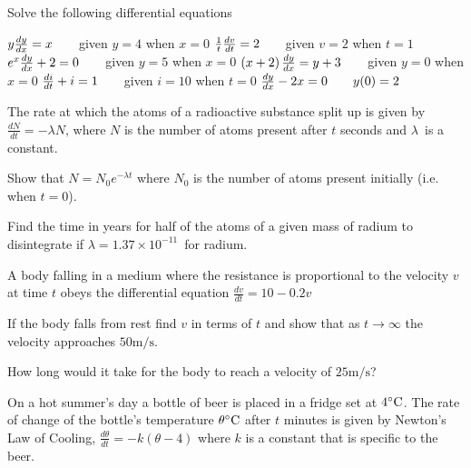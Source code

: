 \begin{Exercise}[title={Separable Equations},label=exSepEqns]
	\Question Solve the following differential equations  
	\begin{tasks}
		\task  $y \frac{d y}{d x} =x\text{\quad \quad }$given $y =4$ when $x =0$ %
		\task $\frac{1}{t} \frac{d v}{d t} =2\text{\quad \quad }$given $v =2$ when $t =1$ %
		\task $e^{x} \frac{d y}{d x} +2 =0\text{\quad \quad }$given $y =5$ when $x =0$ %
		\task $\left (x +2\right ) \frac{d y}{d x} =y +3\text{\quad \quad }$given $y =0$ when $x =0$ %
		\task $\frac{d i}{d t} +i =1\text{\quad \quad }$given $i =10$ when $t =0$ %
		\task $\frac{d y}{d x} -2 x =0\text{\quad \quad }y (0) =2$ %
	\end{tasks}
	

\Question The rate at which the atoms of a radioactive substance split up is given by $\frac{d N}{d t} = -\lambda  N\text{,}$ where $N$ is the number of atoms present after $t$ seconds and $\lambda $\ is a constant. 
\begin{tasks}
	\task Show that $N =N_{0} e^{ -\lambda  t}$ where $N_{0}$ is the number of atoms present initially (i.e. when $t =0$). 
	
	\task Find the time in years for half of the atoms of a given mass of
	radium to disintegrate if $\lambda  =1.37 \times 10^{ -11}$\ for radium. \end{tasks}

\Question A body falling in a medium where the resistance is proportional to the velocity $v$ at time $t$ obeys the differential equation $\frac{d v}{d t} =10 -0.2 v$ 
\begin{tasks}
	\task If the body falls from rest find $v$ in terms of $t$ and show that as $t \rightarrow \infty $ the velocity approaches $50 \mathrm{m}/\mbox{s}$. 
	
	\task How long would it take for the body to reach a velocity of $25 \mathrm{m}/\mbox{s}$? \end{tasks}

\Question On a hot summer's day a bottle of beer is placed in a fridge set at $4 \mbox{{\ensuremath{{}^\circ}}C}$.  The rate of change of the bottle's temperature $\theta  \mbox{{\ensuremath{{}^\circ}}C}$ after $t$ minutes is given by Newton's Law of Cooling, $\frac{d \theta }{d t} = -k \left (\theta  -4\right )$ where $k$ is a constant that is specific to the beer. 


\end{Exercise}
